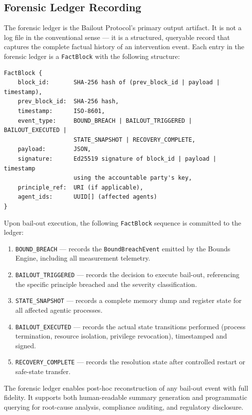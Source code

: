 \subsection{Forensic Ledger Recording}
\label{sec:forensic-ledger}

The forensic ledger is the Bailout Protocol's primary output artifact. It is not a log file in the conventional sense — it is a structured, queryable record that captures the complete factual history of an intervention event. Each entry in the forensic ledger is a \texttt{FactBlock} with the following structure:

\begin{verbatim}
FactBlock {
    block_id:       SHA-256 hash of (prev_block_id | payload | timestamp),
    prev_block_id:  SHA-256 hash,
    timestamp:      ISO-8601,
    event_type:     BOUND_BREACH | BAILOUT_TRIGGERED | BAILOUT_EXECUTED |
                    STATE_SNAPSHOT | RECOVERY_COMPLETE,
    payload:        JSON,
    signature:      Ed25519 signature of block_id | payload | timestamp
                    using the accountable party's key,
    principle_ref:  URI (if applicable),
    agent_ids:      UUID[] (affected agents)
}
\end{verbatim}

Upon bail-out execution, the following \texttt{FactBlock} sequence is committed to the ledger:

\begin{enumerate}
    \item \texttt{BOUND\_BREACH} — records the \texttt{BoundBreachEvent} emitted by the Bounds Engine, including all measurement telemetry.
    \item \texttt{BAILOUT\_TRIGGERED} — records the decision to execute bail-out, referencing the specific principle breached and the severity classification.
    \item \texttt{STATE\_SNAPSHOT} — records a complete memory dump and register state for all affected agentic processes.
    \item \texttt{BAILOUT\_EXECUTED} — records the actual state transitions performed (process termination, resource isolation, privilege revocation), timestamped and signed.
    \item \texttt{RECOVERY\_COMPLETE} — records the resolution state after controlled restart or safe-state transfer.
\end{enumerate}

The forensic ledger enables post-hoc reconstruction of any bail-out event with full fidelity. It supports both human-readable summary generation and programmatic querying for root-cause analysis, compliance auditing, and regulatory disclosure.

